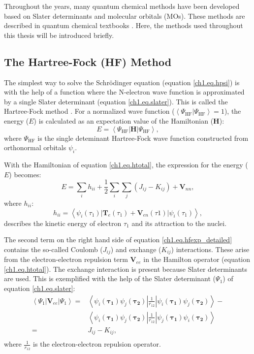 Throughout the years, many quantum chemical methods have been developed based on Slater determinants and molecular orbitals (MOs). These methods are described in quantum chemical textbooks \cite{szabo}. Here, the methods used throughout this thesis will be introduced briefly.

\subsection{The Hartree-Fock (HF) Method}
The simplest way to solve the Schr\"{o}dinger equation (equation \ref{ch1.eq.hpsi}) is with the help of a function where the N-electron wave function is approximated by a single Slater determinant (equation \ref{ch1.eq.slater}). This is called the Hartree-Fock method \cite{hartree1,hartree2,hartree3,fock}. For a normalized wave function ($\left< \Psi_\mathrm{HF} | \Psi_\mathrm{HF} \right> = 1$), the energy ($E$) is calculated as an expectation value of the Hamiltonian ($\mathbf{H}$):
\begin{equation}
E=\left< \Psi_\mathrm{HF} | \mathbf{H} | \Psi_\mathrm{HF} \right>,
\label{ch1.eq.hfexp}
\end{equation}
where $\Psi_\mathrm{HF}$ is the single deteminant Hartree-Fock wave function constructed from orthonormal orbitals $\psi_i$.

With the Hamiltonian of equation \ref{ch1.eq.htotal}, the expression for the energy ($E$) becomes:
\begin{equation}
E=\sum_i h_{ii} + \frac{1}{2} \sum_i\sum_j (J_{ij} - K_{ij}) + \mathbf{V}_{nn},
\label{ch1.eq.hfexp_detailed}
\end{equation}
where $h_{ii}$:
\begin{equation}
h_{ii} = \left< \psi_i(\tau_1) | \mathbf{T}_{e}(\tau_1) + \mathbf{V}_{en}(\tau1) | \psi_i(\tau_1)\right>,
\end{equation}
describes the kinetic energy of electron $\tau_1$ and its attraction to the nuclei.

The second term on the right hand side of equation \ref{ch1.eq.hfexp_detailed} contains the so-called Coulomb ($J_{ij}$) and exchange ($K_{ij}$) interactions. These arise from the electron-electron repulsion term $\mathbf{V}_{ee}$ in the Hamilton operator (equation \ref{ch1.eq.htotal}). The exchange interaction is present because Slater determinants are used. This is exemplified with the help of the Slater determinant ($\Psi_1$) of equation \ref{ch1.eq.slater}:
\begin{equation}
\begin{split}
\left< \Psi_1 | \mathbf{V}_{ee} | \Psi_1 \right> = & \left< \psi_i(\mathbf{\tau_1})\psi_j(\mathbf{\tau_2}) | \frac{1}{r_{12}} | \psi_i(\mathbf{\tau_1})\psi_j(\mathbf{\tau_2}) \right> - \\
& \left< \psi_i(\mathbf{\tau_1})\psi_j(\mathbf{\tau_2}) | \frac{1}{r_{12}} | \psi_j(\mathbf{\tau_1})\psi_i(\mathbf{\tau_2}) \right> \\
= & J_{ij} - K_{ij}, \\
\end{split}
\end{equation}
where $\frac{1}{r_{12}}$ is the electron-electron repulsion operator.

